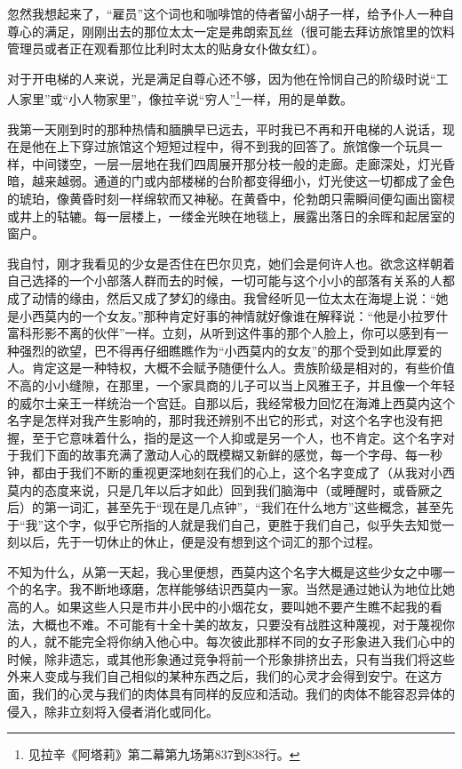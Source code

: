\par 忽然我想起来了，“雇员”这个词也和咖啡馆的侍者留小胡子一样，给予仆人一种自尊心的满足，刚刚出去的那位太太一定是弗朗索瓦丝（很可能去拜访旅馆里的饮料管理员或者正在观看那位比利时太太的贴身女仆做女红）。
\par 对于开电梯的人来说，光是满足自尊心还不够，因为他在怜悯自己的阶级时说“工人家里”或“小人物家里”，像拉辛说“穷人”\footnote{见拉辛《阿塔莉》第二幕第九场第837到838行。}一样，用的是单数。
\par 我第一天刚到时的那种热情和腼腆早已远去，平时我已不再和开电梯的人说话，现在是他在上下穿过旅馆这个短短过程中，得不到我的回答了。旅馆像一个玩具一样，中间镂空，一层一层地在我们四周展开那分枝一般的走廊。走廊深处，灯光昏暗，越来越弱。通道的门或内部楼梯的台阶都变得细小，灯光使这一切都成了金色的琥珀，像黄昏时刻一样绵软而又神秘。在黄昏中，伦勃朗只需瞬间便勾画出窗棂或井上的轱辘。每一层楼上，一缕金光映在地毯上，展露出落日的余晖和起居室的窗户。
\par 我自忖，刚才我看见的少女是否住在巴尔贝克，她们会是何许人也。欲念这样朝着自己选择的一个小部落人群而去的时候，一切可能与这个小小的部落有关系的人都成了动情的缘由，然后又成了梦幻的缘由。我曾经听见一位太太在海堤上说：“她是小西莫内的一个女友。”那种肯定好事的神情就好像谁在解释说：“他是小拉罗什富科形影不离的伙伴”一样。立刻，从听到这件事的那个人脸上，你可以感到有一种强烈的欲望，巴不得再仔细瞧瞧作为“小西莫内的女友”的那个受到如此厚爱的人。肯定这是一种特权，大概不会赋予随便什么人。贵族阶级是相对的，有些价值不高的小小缝隙，在那里，一个家具商的儿子可以当上风雅王子，并且像一个年轻的威尔士亲王一样统治一个宫廷。自那以后，我经常极力回忆在海滩上西莫内这个名字是怎样对我产生影响的，那时我还辨别不出它的形式，对这个名字也没有把握，至于它意味着什么，指的是这一个人抑或是另一个人，也不肯定。这个名字对于我们下面的故事充满了激动人心的既模糊又新鲜的感觉，每一个字母、每一秒钟，都由于我们不断的重视更深地刻在我们的心上，这个名字变成了（从我对小西莫内的态度来说，只是几年以后才如此）回到我们脑海中（或睡醒时，或昏厥之后）的第一词汇，甚至先于“现在是几点钟”，“我们在什么地方”这些概念，甚至先于“我”这个字，似乎它所指的人就是我们自己，更胜于我们自己，似乎失去知觉一刻以后，先于一切休止的休止，便是没有想到这个词汇的那个过程。
\par 不知为什么，从第一天起，我心里便想，西莫内这个名字大概是这些少女之中哪一个的名字。我不断地琢磨，怎样能够结识西莫内一家。当然是通过她认为地位比她高的人。如果这些人只是市井小民中的小烟花女，要叫她不要产生瞧不起我的看法，大概也不难。不可能有十全十美的故友，只要没有战胜这种蔑视，对于蔑视你的人，就不能完全将你纳入他心中。每次彼此那样不同的女子形象进入我们心中的时候，除非遗忘，或其他形象通过竞争将前一个形象排挤出去，只有当我们将这些外来人变成与我们自己相似的某种东西之后，我们的心灵才会得到安宁。在这方面，我们的心灵与我们的肉体具有同样的反应和活动。我们的肉体不能容忍异体的侵入，除非立刻将入侵者消化或同化。
